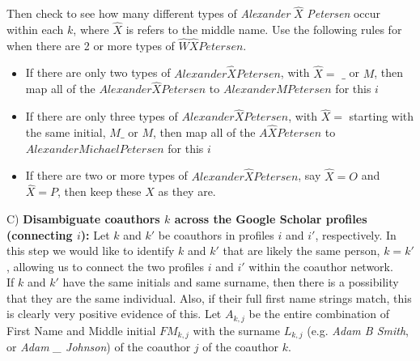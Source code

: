 
Then check to see how many different types of {\it Alexander} $\hat X$ {\it Petersen} occur within each $k$, where $\hat X$ is refers to the middle name. Use the following rules for when there are 2 or more types of $\hat W \hat X Petersen$.
 
 \begin{itemize}
 \item If there are only two  types of $Alexander \hat X Petersen$, with $\hat X=$ $\_$ or $M$, then map all of the $Alexander \hat X Petersen$ to $Alexander M Petersen$ for this $i$
 \item If there are only three types of $Alexander \hat X Petersen$, with $\hat X=$ starting with the same initial, $M\_$ or $M$, then map all of the $A\hat X Petersen$ to $Alexander Michael Petersen$ for this $i$
 \item If there are two or more types of $Alexander \hat X Petersen$, say $\hat X=O$ and $\hat X=P$, then keep these $X$ as they are.
 
  
\end{itemize}

C)  {\bf Disambiguate coauthors $k$ across the Google Scholar profiles (connecting $i$):} Let  $k$ and $k'$ be coauthors in profiles $i$ and $i'$, respectively.   In this step we would like to identify $k$ and $k'$ that are likely the same person, $k=k'$, allowing us to connect the two profiles $i$ and $i'$ within the coauthor network.\\

 If $k$ and $k'$ have the same initials and same surname, then there is a possibility that they are the same individual. Also, if their full first name strings match, this is clearly very positive evidence of this. Let $A_{k,j}$ be the entire combination of First Name and Middle initial $FM_{k,j}$ with the surname $L_{k,j}$ (e.g. {\it Adam B Smith}, or {\it Adam \_ Johnson}) of the coauthor $j$ of the coauthor $k$. 

